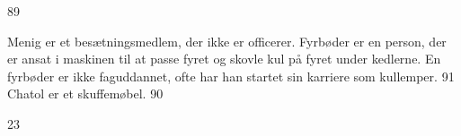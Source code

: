 89

Menig er et besætningsmedlem, der ikke er officerer. Fyrbøder er en
person, der er ansat i maskinen til at passe fyret og skovle kul på
fyret under kedlerne. En fyrbøder er ikke faguddannet, ofte har han
startet sin karriere som kullemper. 91 Chatol er et skuffemøbel. 90

23
